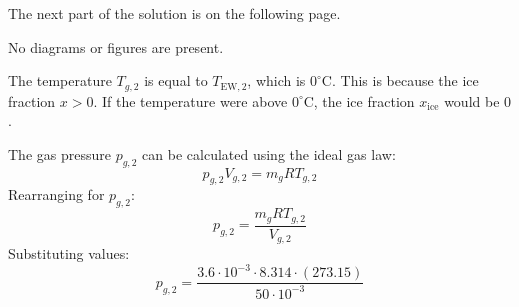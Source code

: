 The next part of the solution is on the following page.  

No diagrams or figures are present.

The temperature \( T_{g,2} \) is equal to \( T_{\text{EW},2} \), which is \( 0^\circ\text{C} \). This is because the ice fraction \( x > 0 \). If the temperature were above \( 0^\circ\text{C} \), the ice fraction \( x_{\text{ice}} \) would be \( 0 \).  

The gas pressure \( p_{g,2} \) can be calculated using the ideal gas law:  
\[
p_{g,2} V_{g,2} = m_g R T_{g,2}
\]  
Rearranging for \( p_{g,2} \):  
\[
p_{g,2} = \frac{m_g R T_{g,2}}{V_{g,2}}
\]  
Substituting values:  
\[
p_{g,2} = \frac{3.6 \cdot 10^{-3} \cdot 8.314 \cdot (273.15)}{50 \cdot 10^{-3}}
\]